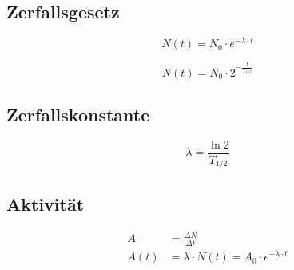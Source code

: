 \subsection{Zerfallsgesetz}
\begin{equation}\label{eq:zerfallsgesetz:zerfallskonstante}
N(t) = N_0 \cdot e^{-\lambda \cdot t}
\end{equation}

\begin{equation}\label{eq:zerfallsgesetz:halbwertszeit}
N(t) = N_0 \cdot 2^{-\frac{t}{T_{1/2}}}
\end{equation}

\subsection{Zerfallskonstante}
\begin{equation}\label{eq:zerfallskonstante}
\lambda = \frac{\ln 2}{T_{1/2}}
\end{equation}

\subsection{Aktivität}
\begin{align}
\label{eq:aktivitaet}
A &= \frac{\Delta N}{\Delta t} \\
\label{eq:aktivitaet:t}
A(t) &= \lambda \cdot N(t) = A_0 \cdot
e^{-\lambda \cdot t}
\end{align}
